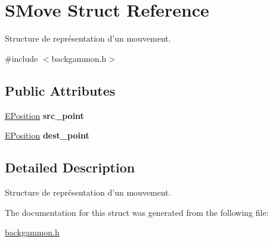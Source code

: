 \hypertarget{structSMove}{
\section{SMove Struct Reference}
\label{structSMove}
}


Structure de représentation d'un mouvement.  




{\ttfamily \#include $<$backgammon.h$>$}

\subsection*{Public Attributes}
\begin{DoxyCompactItemize}
\item 
\hypertarget{structSMove_a8aa6c2b496556d5a995a537036b95f49}{
\hyperlink{backgammon_8h_a9247f6215e9419cfc6a8a7e914f2520d}{EPosition} {\bfseries src\_\-point}}
\label{structSMove_a8aa6c2b496556d5a995a537036b95f49}

\item 
\hypertarget{structSMove_aa57cd85d07d2bdc977d932d19a154524}{
\hyperlink{backgammon_8h_a9247f6215e9419cfc6a8a7e914f2520d}{EPosition} {\bfseries dest\_\-point}}
\label{structSMove_aa57cd85d07d2bdc977d932d19a154524}

\end{DoxyCompactItemize}


\subsection{Detailed Description}
Structure de représentation d'un mouvement. 

The documentation for this struct was generated from the following file:\begin{DoxyCompactItemize}
\item 
\hyperlink{backgammon_8h}{backgammon.h}\end{DoxyCompactItemize}
